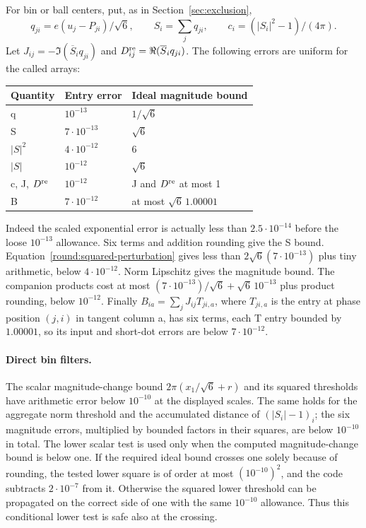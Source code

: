 For bin or ball centers, put, as in
Section~\ref{sec:exclusion},
\[
 q_{ji}=e(u_j-P_{ji})/\sqrt6,\qquad S_i=\sum_jq_{ji},\qquad
 c_i=(|S_i|^2-1)/(4\pi).
\]
Let $J_{ij}=-\Im(\overline S_iq_{ji})$ and
$D_{ij}^{\rm re}=\Re(\overline S_iq_{ji})$.
The following errors are uniform for the called arrays:
\begin{center}
\begin{tabular}{lll}
\hline
Quantity & Entry error & Ideal magnitude bound\\
\hline
q & $10^{-13}$ & $1/\sqrt6$\\
S & $7\cdot10^{-13}$ & $\sqrt6$\\
$|S|^2$ & $4\cdot10^{-12}$ & 6\\
$|S|$ & $10^{-12}$ & $\sqrt6$\\
c, J, $D^{\rm re}$ & $10^{-12}$ & J and $D^{\rm re}$ at most 1\\
B & $7\cdot10^{-12}$ & at most $\sqrt6\,1.00001$\\
\hline
\end{tabular}
\end{center}
Indeed the scaled exponential error is actually less than
$2.5\cdot10^{-14}$ before the loose $10^{-13}$ allowance.
Six terms and addition rounding give the S bound.
Equation~\eqref{round:squared-perturbation} gives less than
$2\sqrt6(7\cdot10^{-13})$ plus tiny arithmetic, below
$4\cdot10^{-12}$.
Norm Lipschitz gives the magnitude bound.
The companion products cost at most
$(7\cdot10^{-13})/\sqrt6+\sqrt6\,10^{-13}$
plus product rounding, below $10^{-12}$.
Finally $B_{ia}=\sum_jJ_{ij}T_{ji,a}$, where $T_{ji,a}$ is the
entry at phase position $(j,i)$ in tangent column a, has six terms, each T
entry bounded by $1.00001$, so its input and short-dot errors are
below $7\cdot10^{-12}$.

\paragraph{Direct bin filters.}
The scalar magnitude-change bound
$2\pi(x_1/\sqrt6+r)$ and its squared thresholds have arithmetic
error below $10^{-10}$ at the displayed scales.
The same holds for the aggregate norm threshold and the accumulated
distance of $(|S_i|-1)_i$; the six magnitude errors, multiplied by
bounded factors in their squares, are below $10^{-10}$ in total.
The lower scalar test is used only when the computed magnitude-change
bound is below one.
If the required ideal bound crosses one solely because of rounding,
the tested lower square is of order at most $(10^{-10})^2$,
and the code subtracts $2\cdot10^{-7}$ from it.
Otherwise the squared lower threshold can be propagated on the
correct side of one with the same $10^{-10}$ allowance.
Thus this conditional lower test is safe also at the crossing.


